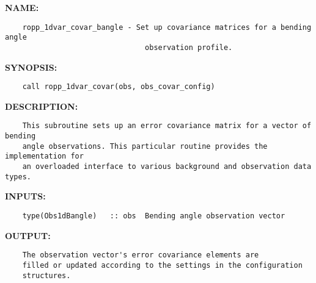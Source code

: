 \label{ch:robo12}
\label{ch:Error_covariances_ropp_1dvar_covar_bangle}
\textbf{NAME:}\hspace{0.08in}\begin{Verbatim}
    ropp_1dvar_covar_bangle - Set up covariance matrices for a bending angle
                                observation profile.
\end{Verbatim}
\textbf{SYNOPSIS:}\hspace{0.08in}\begin{Verbatim}
    call ropp_1dvar_covar(obs, obs_covar_config)
\end{Verbatim}
\textbf{DESCRIPTION:}\hspace{0.08in}\begin{Verbatim}
    This subroutine sets up an error covariance matrix for a vector of bending
    angle observations. This particular routine provides the implementation for
    an overloaded interface to various background and observation data types.
\end{Verbatim}
\textbf{INPUTS:}\hspace{0.08in}\begin{Verbatim}
    type(Obs1dBangle)   :: obs  Bending angle observation vector
\end{Verbatim}
\textbf{OUTPUT:}\hspace{0.08in}\begin{Verbatim}
    The observation vector's error covariance elements are
    filled or updated according to the settings in the configuration
    structures. 
\end{Verbatim}
